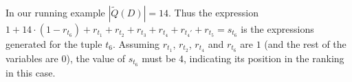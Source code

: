 \begin{example}
\label{ex:position}
In our running example $|\widetilde{Q}(D)| = 14$. Thus the expression $1 + 14 \cdot (1 - r_{t_6}) + r_{t_1} + r_{t_2} + r_{t_3} + r_{t_4} + r_{t_4'} + r_{t_5} = s_{t_6}$ is  the expressions generated for the tuple $t_6$. Assuming $r_{t_1}$, $r_{t_2}$, $r_{t_4}$ and $r_{t_6}$ are $1$ (and the rest of the variables are $0$), the value of $s_{t_6}$ must be $4$, indicating its position in the ranking in this case.


\end{example}


